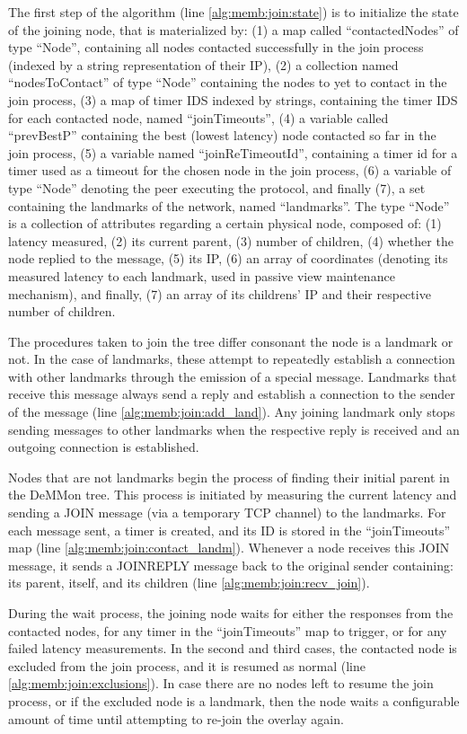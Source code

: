 The first step of the algorithm (line \ref{alg:memb:join:state}) is to initialize the state of the joining node, that is materialized by: (1) a map called ``contactedNodes'' of type ``Node'', containing all nodes contacted successfully in the join process (indexed by a string representation of their IP), (2) a collection named ``nodesToContact'' of type ``Node'' containing the nodes to yet to contact in the join process, (3) a map of timer IDS indexed by strings, containing the timer IDS for each contacted node, named ``joinTimeouts'', (4) a variable called ``prevBestP'' containing the best (lowest latency) node contacted so far in the join process, (5) a variable named ``joinReTimeoutId'', containing a timer id for a timer used as a timeout for the chosen node in the join process, (6) a variable of type ``Node'' denoting the peer executing the protocol, and finally (7), a set containing the landmarks of the network, named ``landmarks''. The type ``Node'' is a collection of attributes regarding a certain physical node, composed of: (1) latency measured, (2) its current parent, (3) number of children, (4) whether the node replied to the message, (5) its IP, (6) an array of coordinates (denoting its measured latency to each landmark, used in passive view maintenance mechanism), and finally, (7) an array of its childrens' IP and their respective number of children.
 
The procedures taken to join the tree differ consonant the node is a landmark or not. In the case of landmarks, these attempt to repeatedly establish a connection with other landmarks through the emission of a special message. Landmarks that receive this message always send a reply and establish a connection to the sender of the message (line \ref{alg:memb:join:add_land}). Any joining landmark only stops sending messages to other landmarks when the respective reply is received and an outgoing connection is established.

Nodes that are not landmarks begin the process of finding their initial parent in the DeMMon tree. This process is initiated by measuring the current latency and sending a JOIN message (via a temporary TCP channel) to the landmarks. For each message sent, a timer is created, and its ID is stored in the ``joinTimeouts'' map (line \ref{alg:memb:join:contact_landm}). Whenever a node receives this JOIN message, it sends a JOINREPLY message back to the original sender containing: its parent, itself, and its children (line \ref{alg:memb:join:recv_join}).

During the wait process, the joining node waits for either the responses from the contacted nodes, for any timer in the ``joinTimeouts'' map to trigger, or for any failed latency measurements. In the second and third cases, the contacted node is excluded from the join process, and it is resumed as normal (line \ref{alg:memb:join:exclusions}). In case there are no nodes left to resume the join process, or if the excluded node is a landmark, then the node waits a configurable amount of time until attempting to re-join the overlay again. 

